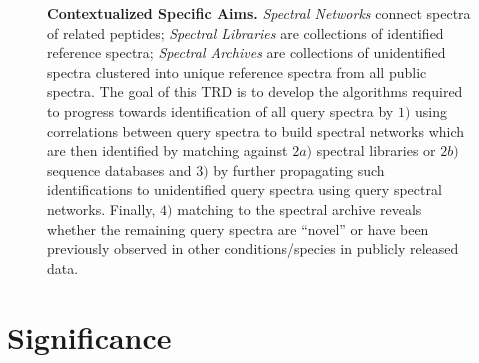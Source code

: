 \documentclass[arial,11pt]{article}
\begin{document}
\begin{figure}[!htb]
\centering

\caption{\footnotesize{\bf Contextualized Specific Aims.} {\em Spectral Networks} connect spectra of related peptides; {\em Spectral Libraries} are collections of identified reference spectra; {\em Spectral Archives} are collections of unidentified spectra clustered into unique reference spectra from all public spectra. The goal of this TRD is to develop the algorithms required to progress towards identification of all query spectra by $1)$ using correlations between query spectra to build spectral networks which are then identified by matching against $2a)$ spectral libraries or $2b)$ sequence databases and $3)$ by further propagating such identifications to unidentified query spectra using query spectral networks. Finally, $4)$ matching to the spectral archive reveals whether the remaining query spectra are ``novel'' or have been previously observed in other conditions/species in publicly released data.}
\label{trd.snets.fig.aims}
\end{figure}

\section{Significance}

\end{document}
